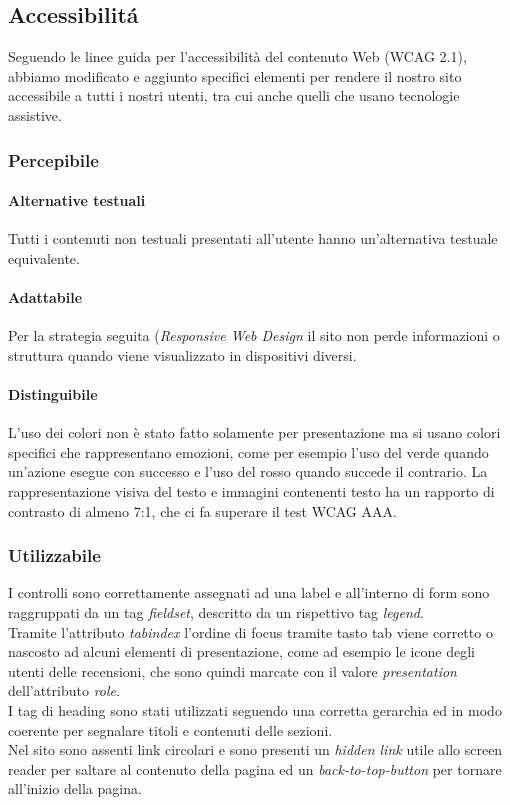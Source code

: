 \newpage
\subsection{Accessibilitá}
Seguendo le linee guida per l'accessibilità del contenuto Web (WCAG 2.1), abbiamo modificato e aggiunto specifici elementi per rendere il nostro sito accessibile a tutti i nostri utenti, tra cui anche quelli che usano tecnologie assistive.   
\subsubsection{Percepibile}
\paragraph{Alternative testuali}
Tutti i contenuti non testuali presentati all'utente hanno un'alternativa testuale equivalente.
\paragraph{Adattabile}
Per la strategia seguita (\textit{Responsive Web Design} il sito non perde informazioni o struttura quando viene visualizzato in dispositivi diversi.
\paragraph{Distinguibile}
L'uso dei colori non è stato fatto solamente per presentazione ma si usano colori specifici che rappresentano emozioni, come per esempio l'uso del verde quando un'azione esegue con successo e l'uso del rosso quando succede il contrario.
La rappresentazione visiva del testo e immagini contenenti testo ha un rapporto di contrasto di almeno 7:1, che ci fa superare il test WCAG AAA.
\subsubsection{Utilizzabile}
I controlli sono correttamente assegnati ad una label e all'interno di form sono raggruppati da un tag \textit{fieldset}, descritto da un rispettivo tag \textit{legend}.\\
Tramite l'attributo \textit{tabindex} l'ordine di focus tramite tasto tab viene corretto o nascosto ad alcuni elementi di presentazione, come ad esempio le icone degli utenti delle recensioni, che sono quindi marcate con il valore \textit{presentation} dell'attributo \textit{role}.\\

I tag di heading sono stati utilizzati seguendo una corretta gerarchia ed in modo coerente per segnalare titoli e contenuti delle sezioni.\\
Nel sito sono assenti link circolari e sono presenti un \textit{hidden link} utile allo screen reader per saltare al contenuto della pagina ed un \textit{back-to-top-button} per tornare all'inizio della pagina.\\
